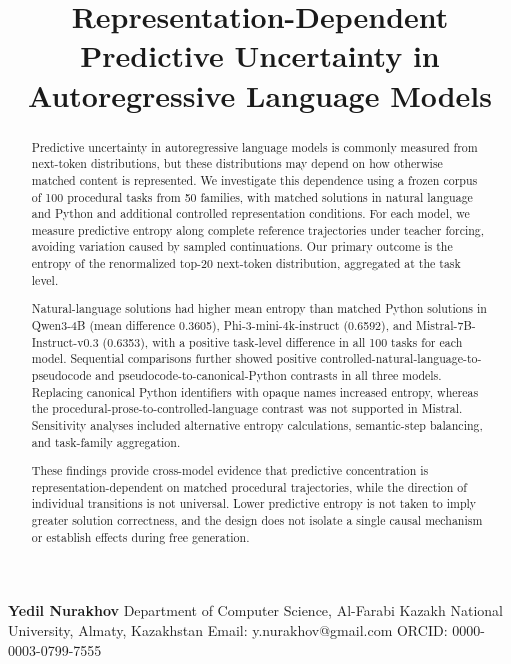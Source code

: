 \documentclass[sn-mathphys-num]{sn-jnl}
\begin{document}
\title[Representation-dependent predictive uncertainty]{Representation-Dependent Predictive Uncertainty in Autoregressive Language Models}
\author*[1]{ }
\maketitle

\textbf{Yedil Nurakhov}
Department of Computer Science, Al-Farabi Kazakh National University, Almaty, Kazakhstan
Email: y.nurakhov@gmail.com
ORCID: 0000-0003-0799-7555

\begin{abstract}

Predictive uncertainty in autoregressive language models is commonly measured from next-token distributions, but these distributions may depend on how otherwise matched content is represented. We investigate this dependence using a frozen corpus of 100 procedural tasks from 50 families, with matched solutions in natural language and Python and additional controlled representation conditions. For each model, we measure predictive entropy along complete reference trajectories under teacher forcing, avoiding variation caused by sampled continuations. Our primary outcome is the entropy of the renormalized top-20 next-token distribution, aggregated at the task level.

Natural-language solutions had higher mean entropy than matched Python solutions in Qwen3-4B (mean difference 0.3605), Phi-3-mini-4k-instruct (0.6592), and Mistral-7B-Instruct-v0.3 (0.6353), with a positive task-level difference in all 100 tasks for each model. Sequential comparisons further showed positive controlled-natural-language-to-pseudocode and pseudocode-to-canonical-Python contrasts in all three models. Replacing canonical Python identifiers with opaque names increased entropy, whereas the procedural-prose-to-controlled-language contrast was not supported in Mistral. Sensitivity analyses included alternative entropy calculations, semantic-step balancing, and task-family aggregation.

These findings provide cross-model evidence that predictive concentration is representation-dependent on matched procedural trajectories, while the direction of individual transitions is not universal. Lower predictive entropy is not taken to imply greater solution correctness, and the design does not isolate a single causal mechanism or establish effects during free generation.

\end{abstract}
\end{document}
